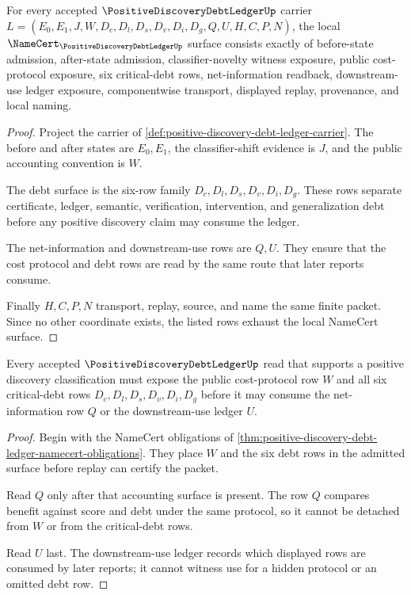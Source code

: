 \begin{theorem}
\label{thm:positive-discovery-debt-ledger-namecert-obligations}
For every accepted $\PositiveDiscoveryDebtLedgerUp$ carrier $L=(E_0,E_1,J,W,D_c,D_l,D_s,D_v,D_i,D_g,Q,U,H,C,P,N)$, the local $\NameCert_{\PositiveDiscoveryDebtLedgerUp}$ surface consists exactly of before-state admission, after-state admission, classifier-novelty witness exposure, public cost-protocol exposure, six critical-debt rows, net-information readback, downstream-use ledger exposure, componentwise transport, displayed replay, provenance, and local naming.
\end{theorem}
\begin{proof}
Project the carrier of \autoref{def:positive-discovery-debt-ledger-carrier}. The before and after states are $E_0,E_1$, the classifier-shift evidence is $J$, and the public accounting convention is $W$.

The debt surface is the six-row family $D_c,D_l,D_s,D_v,D_i,D_g$. These rows separate certificate, ledger, semantic, verification, intervention, and generalization debt before any positive discovery claim may consume the ledger.

The net-information and downstream-use rows are $Q,U$. They ensure that the cost protocol and debt rows are read by the same route that later reports consume.

Finally $H,C,P,N$ transport, replay, source, and name the same finite packet. Since no other coordinate exists, the listed rows exhaust the local NameCert surface.
\end{proof}

\begin{theorem}
\label{thm:positive-discovery-debt-ledger-cost-protocol-route}
Every accepted $\PositiveDiscoveryDebtLedgerUp$ read that supports a positive discovery classification must expose the public cost-protocol row $W$ and all six critical-debt rows $D_c,D_l,D_s,D_v,D_i,D_g$ before it may consume the net-information row $Q$ or the downstream-use ledger $U$.
\end{theorem}
\begin{proof}
Begin with the NameCert obligations of \autoref{thm:positive-discovery-debt-ledger-namecert-obligations}. They place $W$ and the six debt rows in the admitted surface before replay can certify the packet.

Read $Q$ only after that accounting surface is present. The row $Q$ compares benefit against score and debt under the same protocol, so it cannot be detached from $W$ or from the critical-debt rows.

Read $U$ last. The downstream-use ledger records which displayed rows are consumed by later reports; it cannot witness use for a hidden protocol or an omitted debt row.
\end{proof}


